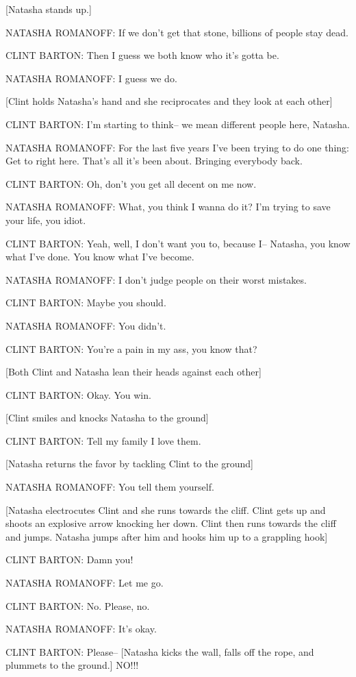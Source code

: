 [Natasha stands up.]

NATASHA ROMANOFF: If we don't get that stone, billions of people stay dead.

CLINT BARTON: Then I guess we both know who it's gotta be.

NATASHA ROMANOFF: I guess we do.

[Clint holds Natasha's hand and she reciprocates and they look at each other]

CLINT BARTON: I'm starting to think– we mean different people here, Natasha.

NATASHA ROMANOFF: For the last five years I've been trying to do one thing: Get to right here. That's all it's been about. Bringing everybody back.

CLINT BARTON: Oh, don't you get all decent on me now.

NATASHA ROMANOFF: What, you think I wanna do it? I'm trying to save your life, you idiot.

CLINT BARTON: Yeah, well, I don't want you to, because I– Natasha, you know what I've done. You know what I've become.

NATASHA ROMANOFF: I don't judge people on their worst mistakes.

CLINT BARTON: Maybe you should.

NATASHA ROMANOFF: You didn't.

CLINT BARTON: You're a pain in my ass, you know that?

[Both Clint and Natasha lean their heads against each other]

CLINT BARTON: Okay. You win.

[Clint smiles and knocks Natasha to the ground]

CLINT BARTON: Tell my family I love them.

[Natasha returns the favor by tackling Clint to the ground]

NATASHA ROMANOFF: You tell them yourself.

[Natasha electrocutes Clint and she runs towards the cliff. Clint gets up and shoots an explosive arrow knocking her down. Clint then runs towards the cliff and jumps. Natasha jumps after him and hooks him up to a grappling hook]

CLINT BARTON: Damn you!

NATASHA ROMANOFF: Let me go.

CLINT BARTON: No. Please, no.

NATASHA ROMANOFF: It's okay.

CLINT BARTON: Please– [Natasha kicks the wall, falls off the rope, and plummets to the ground.] NO!!!

